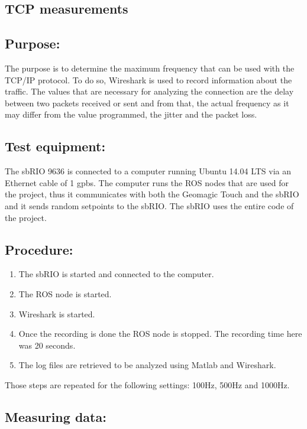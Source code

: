 \subsection{TCP measurements}\label{sec_tcp_mes}


\subsection*{Purpose:}

The purpose is to determine the maximum frequency that can be used with the TCP/IP protocol.  To do so, Wireshark is used to record information about the traffic. The values that are necessary for analyzing the connection are the delay between two packets received or sent and from that, the actual frequency as it may differ from the value programmed, the jitter and the packet loss. 
\subsection*{Test equipment:}

The sbRIO 9636 is connected to a computer running Ubuntu 14.04 LTS via an Ethernet cable of 1 gpbs. The computer runs the ROS nodes that are used for the project, thus it communicates with both the Geomagic Touch and the sbRIO and it sends random setpoints to the sbRIO. The sbRIO uses the entire code of the project.

\subsection*{Procedure:}

\begin{enumerate}
	\item The sbRIO is started and connected to the computer.
	\item The ROS node is started.
	\item Wireshark is started.%
	\item Once the recording is done the ROS node is stopped. The recording time here was 20 seconds.
	\item The log files are retrieved to be analyzed using Matlab and Wireshark.
\end{enumerate}
Those steps are repeated for the following settings: 100Hz, 500Hz and 1000Hz.


\subsection*{Measuring data:}

